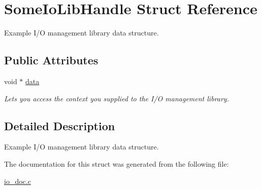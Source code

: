 \hypertarget{structSomeIoLibHandle}{}\section{Some\+Io\+Lib\+Handle Struct Reference}
\label{structSomeIoLibHandle}


Example I/O management library data structure.  


\subsection*{Public Attributes}
\begin{DoxyCompactItemize}
\item 
\mbox{\label{structSomeIoLibHandle_a3268457567f3ec3094c96c4bdf8424e5}} 
void $\ast$ \mbox{\hyperlink{structSomeIoLibHandle_a3268457567f3ec3094c96c4bdf8424e5}{data}}
\begin{DoxyCompactList}\small\item\em Let\textquotesingle{}s you access the context you supplied to the I/O management library. \end{DoxyCompactList}\end{DoxyCompactItemize}


\subsection{Detailed Description}
Example I/O management library data structure. 

The documentation for this struct was generated from the following file\+:\begin{DoxyCompactItemize}
\item 
\mbox{\hyperlink{io__doc_8c}{io\+\_\+doc.\+c}}\end{DoxyCompactItemize}
